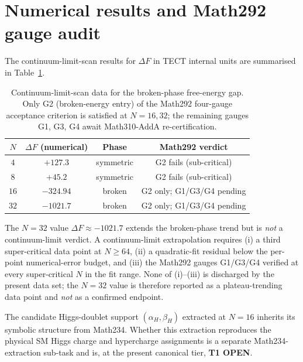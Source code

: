 \section{Numerical results and Math292 gauge audit}\label{sec:results}
The continuum-limit-scan results for $\Delta F$ in TECT internal
units are summarised in Table~\ref{tab:dfscan}.

\begin{table}[h]
\centering
\begin{tabular}{cccc}
\toprule
$N$ & $\Delta F$ (numerical) & Phase & Math292 verdict \\
\midrule
$4$  & $+127.3$  & symmetric & G2 fails (sub-critical) \\
$8$  & $+45.2$   & symmetric & G2 fails (sub-critical) \\
$16$ & $-324.94$ & broken    & G2 only; G1/G3/G4 pending \\
$32$ & $-1021.7$ & broken    & G2 only; G1/G3/G4 pending \\
\bottomrule
\end{tabular}
\caption{Continuum-limit-scan data for the broken-phase free-energy
gap. Only G2 (broken-energy entry) of the Math292 four-gauge
acceptance criterion is satisfied at $N=16,32$; the remaining gauges
G1, G3, G4 await Math310-AddA re-certification.}
\label{tab:dfscan}
\end{table}

\begin{remark}[$N=32$ is not a continuum endpoint]\label{rmk:N32}
The $N=32$ value $\Delta F \approx -1021.7$ extends the broken-phase
trend but is \emph{not} a continuum-limit verdict. A continuum-limit
extrapolation requires (i) a third super-critical data point at
$N\geq 64$, (ii) a quadratic-fit residual below the per-point
numerical-error budget, and (iii) the Math292 gauges G1/G3/G4 verified
at every super-critical $N$ in the fit range. None of (i)--(iii) is
discharged by the present data set; the $N=32$ value is therefore
reported as a plateau-trending data point and \emph{not} as a
confirmed endpoint.
\end{remark}

The candidate Higgs-doublet support $(\alpha_H,\beta_H)$ extracted at
$N=16$ inherits its symbolic structure from Math234. Whether this
extraction reproduces the physical SM Higgs charge and hypercharge
assignments is a separate Math234-extraction sub-task and is, at the
present canonical tier, \textbf{T1 OPEN}.

